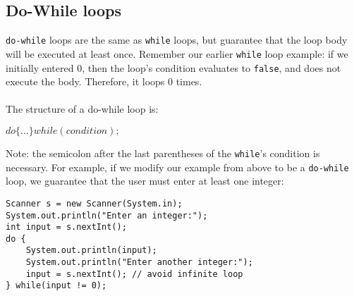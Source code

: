 \subsection{Do-While loops}
\verb|do-while| loops are the same as \verb|while| loops, but guarantee that the loop body will be executed at least once. Remember our earlier \verb|while| loop example: if we initially entered 0, then the loop's condition evaluates to \verb|false|, and does not execute the body. Therefore, it loops 0 times. 
\\ \\
The structure of a do-while loop is:
\begin{center}
$do \{ ... \} while(condition);$
\end{center}
Note: the semicolon after the last parentheses of the \verb|while|'s condition is necessary. For example, if we modify our example from above to be a \verb|do-while| loop, we guarantee that the user must enter at least one integer:
\begin{lstlisting}
Scanner s = new Scanner(System.in);
System.out.println("Enter an integer:");
int input = s.nextInt();
do {
	System.out.println(input);
	System.out.println("Enter another integer:");
	input = s.nextInt(); // avoid infinite loop
} while(input != 0);
\end{lstlisting}

